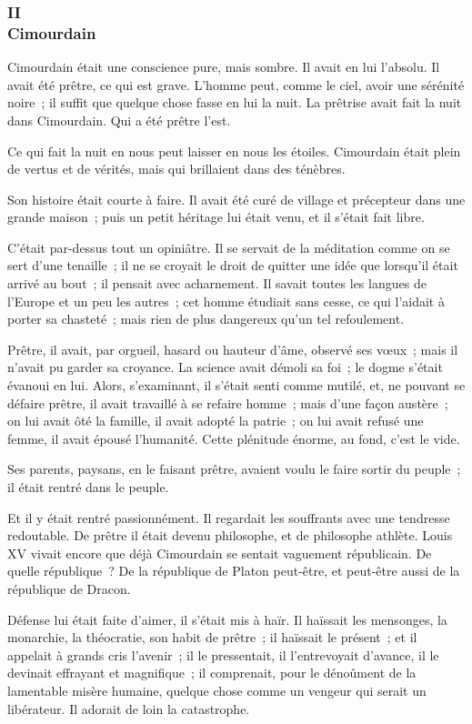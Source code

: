 \documentclass[french,twoside]{book} %
\begin{document}
 \subsubsection[{II. Cimourdain}]{II \\
Cimourdain}
\label{p2l1c2}
\noindent Cimourdain était une conscience pure, mais sombre. Il avait en lui l’absolu. Il avait été prêtre, ce qui est grave. L’homme peut, comme le ciel, avoir une sérénité noire ; il suffit que quelque chose fasse en lui la nuit. La prêtrise avait fait la nuit dans Cimourdain. Qui a été prêtre l’est.\par
Ce qui fait la nuit en nous peut laisser en nous les étoiles. Cimourdain était plein de vertus et de vérités, mais qui brillaient dans des ténèbres.\par
Son histoire était courte à faire. Il avait été curé de village et précepteur dans une grande maison ; puis un petit héritage lui était venu, et il s’était fait libre.\par
C’était par-dessus tout un opiniâtre. Il se servait de la méditation comme on se sert d’une tenaille ; il ne se croyait le droit de quitter une idée que lorsqu’il était arrivé au bout ; il pensait avec acharnement. Il savait toutes les langues de l’Europe et un peu les autres ; cet homme étudiait sans cesse, ce qui l’aidait à porter sa chasteté ; mais rien de plus dangereux qu’un tel refoulement.\par
Prêtre, il avait, par orgueil, hasard ou hauteur  d’âme, observé ses vœux ; mais il n’avait pu garder sa croyance. La science avait démoli sa foi ; le dogme s’était évanoui en lui. Alors, s’examinant, il s’était senti comme mutilé, et, ne pouvant se défaire prêtre, il avait travaillé à se refaire homme ; mais d’une façon austère ; on lui avait ôté la famille, il avait adopté la patrie ; on lui avait refusé une femme, il avait épousé l’humanité. Cette plénitude énorme, au fond, c’est le vide.\par
Ses parents, paysans, en le faisant prêtre, avaient voulu le faire sortir du peuple ; il était rentré dans le peuple.\par
Et il y était rentré passionnément. Il regardait les souffrants avec une tendresse redoutable. De prêtre il était devenu philosophe, et de philosophe athlète. Louis XV vivait encore que déjà Cimourdain se sentait vaguement républicain. De quelle république ? De la république de Platon peut-être, et peut-être aussi de la république de Dracon.\par
Défense lui était faite d’aimer, il s’était mis à haïr. Il haïssait les mensonges, la monarchie, la théocratie, son habit de prêtre ; il haïssait le présent ; et il appelait à grands cris l’avenir ; il le pressentait, il l’entrevoyait d’avance, il le devinait effrayant et magnifique ; il comprenait, pour le dénoûment de la lamentable misère humaine, quelque chose comme un vengeur qui serait un libérateur. Il adorait de loin la catastrophe.\par
\end{document}
